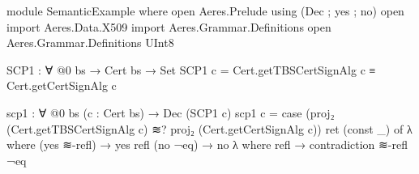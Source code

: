 \documentclass[11pt]{article}
\begin{document}
  \begin{AgdaAlign}
\begin{code}[hide]
module SemanticExample where
  open Aeres.Prelude using (Dec ; yes ; no)
  open import Aeres.Data.X509
  import      Aeres.Grammar.Definitions
  open Aeres.Grammar.Definitions UInt8
\end{code}
\begin{code}
  SCP1 : ∀ {@0 bs} → Cert bs → Set
  SCP1 c = Cert.getTBSCertSignAlg c ≡ Cert.getCertSignAlg c

  scp1 :  ∀ {@0 bs} (c : Cert bs) → Dec (SCP1 c)
  scp1 c =
    case (proj₂ (Cert.getTBSCertSignAlg c) ≋? proj₂ (Cert.getCertSignAlg c)) ret (const _) of λ where
      (yes ≋-refl) → yes refl
      (no ¬eq) → no λ where refl → contradiction ≋-refl ¬eq
\end{code}
  \end{AgdaAlign}
\end{document}
